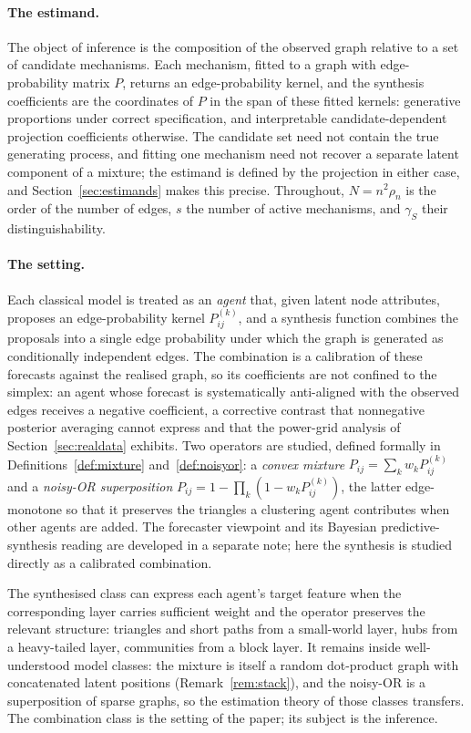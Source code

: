 \documentclass[12pt]{article}
\newcommand{\1}{\mathbf{1}}
\begin{document}
\paragraph{The estimand.}
The object of inference is the composition of the observed graph relative to a set of candidate mechanisms.
Each mechanism, fitted to a graph with edge-probability matrix $P$, returns an edge-probability kernel, and
the synthesis coefficients are the coordinates of $P$ in the span of these fitted kernels: generative
proportions under correct specification, and interpretable candidate-dependent projection coefficients
otherwise. The candidate set need not contain the true generating process, and fitting one mechanism need not
recover a separate latent component of a mixture; the estimand is defined by the projection in either case,
and Section~\ref{sec:estimands} makes this precise. Throughout, $N=n^2\rho_n$ is the order of the number of
edges, $s$ the number of active mechanisms, and $\gamma_S$ their distinguishability.

\paragraph{The setting.}
Each classical model is treated as an \emph{agent} that, given latent node attributes, proposes an
edge-probability kernel $P^{(k)}_{ij}$, and a synthesis function combines the proposals into a single edge
probability under which the graph is generated as conditionally independent edges. The combination is a
calibration of these forecasts against the realised graph, so its coefficients are not confined to the simplex:
an agent whose forecast is systematically anti-aligned with the observed edges receives a negative coefficient,
a corrective contrast that nonnegative posterior averaging cannot express and that the power-grid analysis of
Section~\ref{sec:realdata} exhibits. Two operators are studied, defined formally in
Definitions~\ref{def:mixture} and~\ref{def:noisyor}: a \emph{convex mixture}
$P_{ij}=\sum_k w_k P^{(k)}_{ij}$ and a \emph{noisy-OR superposition} $P_{ij}=1-\prod_k(1-w_k P^{(k)}_{ij})$,
the latter edge-monotone so that it preserves the triangles a clustering agent contributes when other agents
are added. The forecaster viewpoint and its Bayesian predictive-synthesis reading
\citep{mcalinn2019dynamic,mcalinn2020multivariate} are developed in a separate note; here the synthesis is studied directly as
a calibrated combination.

The synthesised class can express each agent's target feature when the corresponding layer carries
sufficient weight and the operator preserves the relevant structure: triangles and short paths from a
small-world layer, hubs from a heavy-tailed layer, communities from a block layer. It remains
inside well-understood model classes: the mixture is itself a random dot-product graph with
concatenated latent positions (Remark~\ref{rem:stack}), and the noisy-OR is a superposition of
sparse graphs, so the estimation theory of those classes transfers. The combination class is the
setting of the paper; its subject is the inference.
\end{document}
